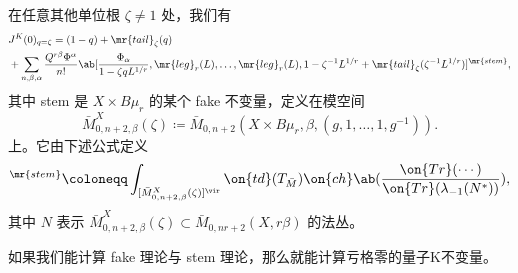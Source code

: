 \begin{prop}
    在任意其他单位根 \(\zeta \neq 1\) 处，我们有
    \begin{align*}
        &J^K(0)_{q = \zeta} = (1-q) + \mr{tail}_{\zeta}(q) \\
        &+ \sum_{n,\beta,\alpha} \frac{Q^{r\beta}\Phi^{\alpha}}{n!} \ab[\frac{\Phi_{\alpha}}{1-\zeta q L^{1/r}}, \mr{leg}_r(L), \ldots, \mr{leg}_r(L), 1 - \zeta^{-1}L^{1/r} + \mr{tail}_{\zeta}(\zeta^{-1} L^{1/r})]^{\mr{stem}},
    \end{align*}
    其中 stem 是 \(X \times B\mu_r\) 的某个 fake 不变量，定义在模空间
    \[ \bar{M}_{0,n+2,\beta}^X(\zeta) \coloneqq \bar{M}_{0,n+2}(X \times B\mu_r, \beta, (g, 1, \ldots, 1, g^{-1})). \]
    上。它由下述公式定义
    \begin{align*}
        [\cdots]^{\mr{stem}} \coloneqq \int_{[\bar{M}_{0,n+2,\beta}^X(\zeta)]^{\vir}} \on{td}(T_{\bar{M}}) \on{ch}\ab(\frac{\on{Tr}(\cdots)}{\on{Tr}(\lambda_{-1}(N^*))}), 
    \end{align*}
    其中 \(N\) 表示 \(\bar{M}_{0,n+2,\beta}^X(\zeta) \subset \bar{M}_{0,nr+2}(X, r\beta)\) 的法丛。
\end{prop}

\begin{rmk}
    如果我们能计算 fake 理论与 stem 理论，那么就能计算亏格零的量子K不变量。
\end{rmk}

